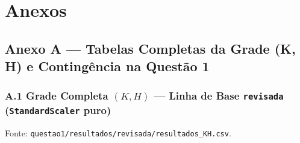 \documentclass[a4paper,11pt]{article}
\begin{document}
\section{Anexos}\label{sec:6-anexos}


\subsection*{Anexo A --- Tabelas Completas da Grade (K, H) e Contingência na Questão 1}\label{sec:anexo-a-tabelas-completas-da-grade-k-h-e-contingencia-na-questao-1}


\subsubsection*{\texorpdfstring{A.1 Grade Completa $(K, H)$ --- Linha de Base \texttt{revisada} (\texttt{StandardScaler} puro)}{A.1 Grade Completa (K, H) - Linha de Base revisada (StandardScaler puro)}}\label{sec:a-1-grade-completa-k-h-linha-de-base-revisada-standardscaler-puro}


Fonte: \texttt{questao1/\allowbreak resultados/\allowbreak revisada/\allowbreak resultados\_\allowbreak KH.csv}.
\end{document}
